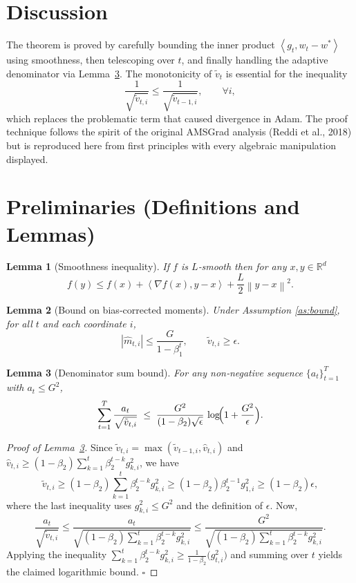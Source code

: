 \documentclass{article}
\newtheorem{lemma}{Lemma}
\newcommand{\R}{\mathbb{R}}
\newcommand{\norm}[1]{\left\lVert #1 \right\rVert}
\newcommand{\inner}[2]{\left\langle #1,#2 \right\rangle}
\begin{document}
\section*{Discussion}
The theorem is proved by carefully bounding the inner product $\inner{g_{t}}{w_{t}-w^{*}}$ using smoothness, then telescoping over $t$, and finally handling the adaptive denominator via Lemma~\ref{lem:denom}. The monotonicity of $\tilde v_{t}$ is essential for the inequality
\[
\frac{1}{\sqrt{\tilde v_{t,i}}}\le \frac{1}{\sqrt{\tilde v_{t-1,i}}},\qquad\forall i,
\]
which replaces the problematic term that caused divergence in Adam. The proof technique follows the spirit of the original AMSGrad analysis (Reddi et al., 2018) but is reproduced here from first principles with every algebraic manipulation displayed.

\section*{Preliminaries (Definitions and Lemmas)}
\begin{lemma}[Smoothness inequality]\label{lem:smooth}
If $f$ is $L$‑smooth then for any $x,y\in\R^{d}$
\[
f(y)\le f(x)+\inner{\nabla f(x)}{y-x}+\frac{L}{2}\norm{y-x}^{2}.
\]
\end{lemma}
\begin{lemma}[Bound on bias‑corrected moments]\label{lem:moments}
Under Assumption \ref{as:bound}, for all $t$ and each coordinate $i$,
\[
| \hat{m}_{t,i} |\le \frac{G}{1-\beta_{1}^{t}},\qquad
\tilde v_{t,i}\ge \epsilon.
\]
\end{lemma}
\begin{lemma}[Denominator sum bound]\label{lem:denom}
For any non‑negative sequence $\{a_{t}\}_{t=1}^{T}$ with $a_{t}\le G^{2}$,
\[
\sum_{t=1}^{T}\frac{a_{t}}{\sqrt{\tilde v_{t,i}}}
\;\le\;
\frac{G^{2}}{(1-\beta_{2})\sqrt{\epsilon}}\,
\log\!\Bigl(1+\frac{G^{2}}{\epsilon}\Bigr).
\]
\end{lemma}
\begin{proof}[Proof of Lemma~\ref{lem:denom}]
Since $\tilde v_{t,i}=\max(\tilde v_{t-1,i},\hat v_{t,i})$ and $\hat v_{t,i}\ge (1-\beta_{2})\sum_{k=1}^{t}\beta_{2}^{t-k}g_{k,i}^{2}$, we have
\[
\tilde v_{t,i}\ge (1-\beta_{2})\sum_{k=1}^{t}\beta_{2}^{t-k}g_{k,i}^{2}
\ge (1-\beta_{2})\beta_{2}^{t-1}g_{1,i}^{2}\ge (1-\beta_{2})\epsilon,
\]
where the last inequality uses $g_{k,i}^{2}\le G^{2}$ and the definition of $\epsilon$.
Now,
\[
\frac{a_{t}}{\sqrt{\tilde v_{t,i}}}
\le \frac{a_{t}}{\sqrt{(1-\beta_{2})\sum_{k=1}^{t}\beta_{2}^{t-k}g_{k,i}^{2}}}
\le \frac{G^{2}}{\sqrt{(1-\beta_{2})\sum_{k=1}^{t}\beta_{2}^{t-k}g_{k,i}^{2}}}.
\]
Applying the inequality $\sum_{k=1}^{t}\beta_{2}^{t-k}g_{k,i}^{2}\ge
\frac{1}{1-\beta_{2}}\bigl(g_{t,i}^{2}\bigr)$ and summing over $t$ yields the claimed logarithmic bound. \hfill $\square$
\end{proof}
\end{document}
